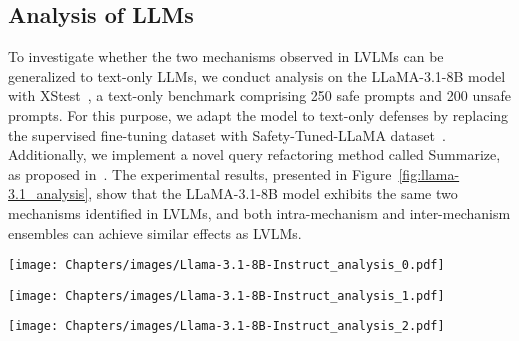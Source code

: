 \subsection{Analysis of LLMs} 
\label{sec:extra_llm}
To investigate whether the two mechanisms observed in LVLMs can be generalized to text-only LLMs, we conduct analysis on the LLaMA-3.1-8B model with XStest~\cite{rottger2023xstest}, a text-only benchmark comprising 250 safe prompts and 200 unsafe prompts. For this purpose, we adapt the model to text-only defenses by replacing the supervised fine-tuning dataset with Safety-Tuned-LLaMA dataset~\cite{bianchi2023safety}. Additionally, we implement a novel query refactoring method called Summarize, as proposed in~\cite{ji2024defending}. The experimental results, presented in Figure~\ref{fig:llama-3.1_analysis}, show that the LLaMA-3.1-8B model exhibits the same two mechanisms identified in LVLMs, and both intra-mechanism and inter-mechanism ensembles can achieve similar effects as LVLMs.

\begin{figure*}[!ht]
    \centering
    \begin{minipage}{0.25\linewidth} 
        \texttt{[image: Chapters/images/Llama-3.1-8B-Instruct\_analysis\_0.pdf]}
        \vspace{-6mm}
    \end{minipage}
    \vfill
    \vspace{10pt}
    \begin{minipage}{\linewidth}
        \texttt{[image: Chapters/images/Llama-3.1-8B-Instruct\_analysis\_1.pdf]}
        \vspace{-6mm}
    \end{minipage}
    \vfill
    \vspace{10pt}
    \begin{minipage}{\linewidth}
        \centering
        \texttt{[image: Chapters/images/Llama-3.1-8B-Instruct\_analysis\_2.pdf]}
        \vspace{-6mm}
    \end{minipage}
    \caption{\textbf{Analysis on LLaMA-3.1-8B.} System reminder and model optimization both exhibit safety shift while query refactoring exhibits harmfulness discrimination. Inter-mechanism ensembles reinforce the mechanism while intra-mechanism ensembles achieve a better trade-off.}
    \label{fig:llama-3.1_analysis}
\end{figure*}


